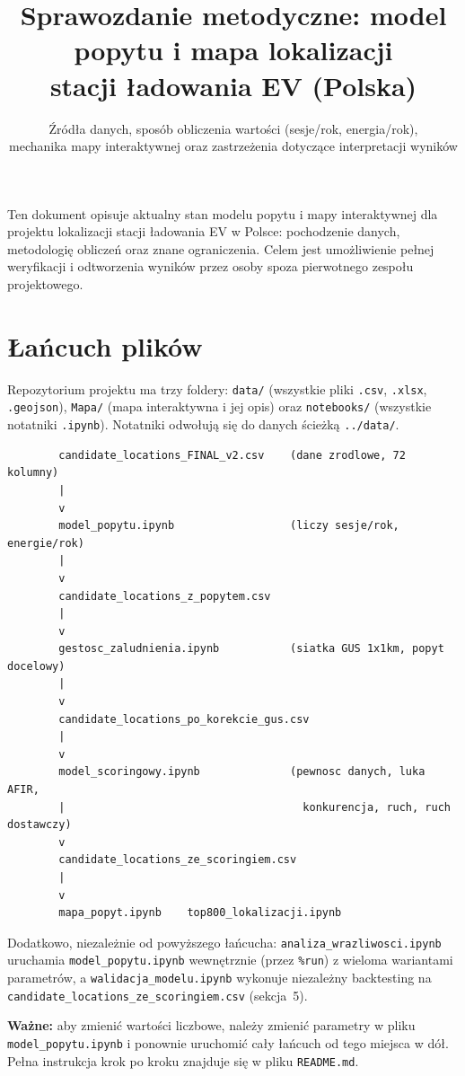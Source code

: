 \documentclass[11pt,a4paper]{article}
\title{\textbf{Sprawozdanie metodyczne: model popytu i mapa lokalizacji\\
		stacji ładowania EV (Polska)}}
\author{Źródła danych, sposób obliczenia wartości (sesje/rok, energia/rok),\\
	mechanika mapy interaktywnej oraz zastrzeżenia dotyczące interpretacji wyników}
\date{}
\begin{document}
	
	\maketitle
	\vspace{-1cm}
	\noindent\hrulefill
	
	\vspace{1cm}
	Ten dokument opisuje aktualny stan modelu popytu i mapy interaktywnej dla
	projektu lokalizacji stacji ładowania EV w Polsce: pochodzenie danych,
	metodologię obliczeń oraz znane ograniczenia. Celem jest umożliwienie
	pełnej weryfikacji i odtworzenia wyników przez osoby spoza pierwotnego
	zespołu projektowego.
	
	\tableofcontents
	\newpage
	
	\section{Łańcuch plików}
	
	Repozytorium projektu ma trzy foldery: \texttt{data/} (wszystkie pliki
	\texttt{.csv}, \texttt{.xlsx}, \texttt{.geojson}), \texttt{Mapa/} (mapa
	interaktywna i jej opis) oraz \texttt{notebooks/} (wszystkie notatniki
	\texttt{.ipynb}). Notatniki odwołują się do danych ścieżką
	\texttt{../data/}.
	
	\begin{verbatim}
		candidate_locations_FINAL_v2.csv    (dane zrodlowe, 72 kolumny)
		|
		v
		model_popytu.ipynb                  (liczy sesje/rok, energie/rok)
		|
		v
		candidate_locations_z_popytem.csv
		|
		v
		gestosc_zaludnienia.ipynb           (siatka GUS 1x1km, popyt docelowy)
		|
		v
		candidate_locations_po_korekcie_gus.csv
		|
		v
		model_scoringowy.ipynb              (pewnosc danych, luka AFIR,
		|                                     konkurencja, ruch, ruch dostawczy)
		v
		candidate_locations_ze_scoringiem.csv
		|           			    
		v          					 
		mapa_popyt.ipynb 	top800_lokalizacji.ipynb 
	\end{verbatim}
	
	Dodatkowo, niezależnie od powyższego łańcucha: \texttt{analiza\_wrazliwosci.ipynb}
	uruchamia \texttt{model\_popytu.ipynb} wewnętrznie (przez \texttt{\%run}) z
	wieloma wariantami parametrów, a \texttt{walidacja\_modelu.ipynb} wykonuje niezależny
	backtesting na \texttt{candidate\_locations\_ze\_scoringiem.csv} (sekcja~5).
	
	\textbf{Ważne:} aby zmienić wartości liczbowe, należy zmienić parametry w pliku \texttt{model\_popytu.ipynb} i ponownie uruchomić cały łańcuch od tego miejsca w dół. Pełna instrukcja krok po kroku znajduje się w pliku \texttt{README.md}.
	
\end{document}
